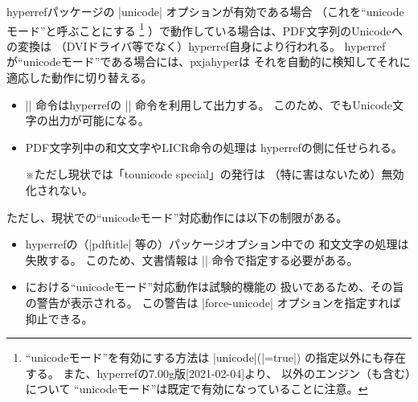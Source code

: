 \documentclass[uplatex,dvipdfmx,a4paper]{jsarticle}
\newcommand{\Pkg}[1]{\textsf{#1}}
\newcommand{\Note}{\par\noindent ※}
\providecommand{\Strong}[1]{\textsf{#1}}
\begin{document}
\Pkg{hyperref}パッケージの |unicode| オプションが有効である場合
（これを“unicodeモード”と呼ぶことにする
\footnote{“unicodeモード”を有効にする方法は |unicode|(|=true|)
  の指定以外にも存在する。
  また、\Pkg{hyperref}の7.00g版[2021-02-04]より、
  {\pLaTeX}以外のエンジン（\Strong{{\upLaTeX}も含む}）について
  “unicodeモード”は既定で有効になっていることに注意。}%
）で動作している場合は、PDF文字列のUnicodeへの変換は
（DVIドライバ等でなく）\Pkg{hyperref}自身により行われる。
\Pkg{hyperref}が“unicodeモード”である場合には、\Pkg{pxjahyper}は
それを自動的に検知してそれに適応した動作に切り替える。
\begin{itemize}
\item |\Ux| 命令は\Pkg{hyperref}の |\unichar| 命令を利用して出力する。
  このため、{\pLaTeX}でもUnicode文字の出力が可能になる。
\item PDF文字列中の和文文字やLICR命令の処理は
  \Pkg{hyperref}の側に任せられる。
  \Note ただし現状では「tounicode special」の発行は
  （特に害はないため）無効化されない。
\end{itemize}
ただし、現状での“unicodeモード”対応動作には以下の制限がある。
\begin{itemize}
\item \Pkg{hyperref}の（|pdftitle| 等の）パッケージオプション中での
  和文文字の処理は失敗する。
  このため、文書情報は |\hypersetup| 命令で指定する必要がある。
\item {\pLaTeX}における“unicodeモード”対応動作は試験的機能の
  扱いであるため、その旨の警告が表示される。
  この警告は |force-unicode| オプションを指定すれば抑止できる。
\end{itemize}
\end{document}
